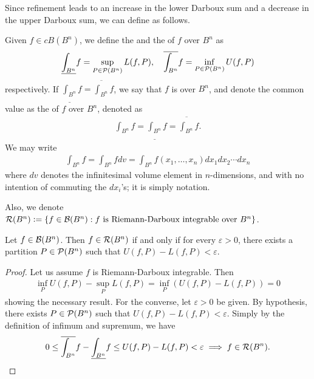 Since refinement leads to an increase in the lower Darboux sum and a decrease in the upper Darboux sum, we can define as follows.
\begin{definition}
    Given $f \in cB(B^{n})$, we define the  and the  of $f$ over $B^{n}$ as
    \begin{align}
        \underline{\int_{B^{n}}} f = \sup_{P \in \mathcal{P}(B^{n})} L(f,P), \quad \overline{\int_{B^{n}}} f = \inf_{P \in \mathcal{P}(B^{n})} U(f,P)
    \end{align}
    respectively. If $\underline{\int_{B^{n}}} f = \overline{\int_{B^{n}}} f$, we say that $f$ is  over $B^{n}$, and denote the common value as the  of $f$ over $B^{n}$, denoted as
    \begin{align}
        \int_{B^{n}} f = \underline{\int_{B^{n}}} f = \overline{\int_{B^{n}}} f.
    \end{align}
    We may write
    \begin{align}
        \int_{B^{n}} f = \int_{B^{n}} f dv = \int_{B^{n}} f(x_{1},\ldots,x_{n}) dx_{1} dx_{2} \cdots dx_{n}
    \end{align}
    where $dv$ denotes the infinitesimal volume element in $n$-dimensions, and with no intention of commuting the $dx_{i}$'s; it is simply notation.
\end{definition}

Also, we denote $\mathcal{R}(B^{n}) \vcentcolon= \{f \in \mathcal{B}(B^{n}) : f \text{ is Riemann-Darboux integrable over } B^{n}\}$.

\begin{theorem}
    Let $f \in \mathcal{B}(B^{n})$. Then $f \in \mathcal{R}(B^{n})$ if and only if for every $\varepsilon > 0$, there exists a partition $P \in \mathcal{P}(B^{n})$ such that $U(f,P) - L(f,P) < \varepsilon$.
\end{theorem}
\begin{proof}
    Let us assume $f$ is Riemann-Darboux integrable. Then
    \begin{align}
        \inf_{P}U(f,P) - \sup_{P}L(f,P) = \inf_{P}(U(f,P)-L(f,P)) = 0
    \end{align}
    showing the necessary result. For the converse, let $\varepsilon > 0$ be given. By hypothesis, there exists $P \in \mathcal{P}(B^{n})$ such that $U(f,P) - L(f,P) < \varepsilon$. Simply by the definition of infimum and supremum, we have
    \begin{align}
        0 \leq \overline{\int_{B^{n}}} f - \underline{\int_{B^{n}}} f \leq U(f,P) - L(f,P) < \varepsilon \implies f \in \mathcal{R}(B^{n}).
    \end{align}
\end{proof}

